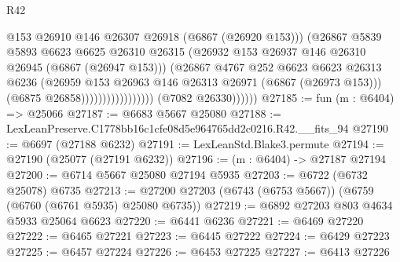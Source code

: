 \begin{lexlean}{R42}
\begin{coremodule}
{                                            @153
                                            @26910
                                            @146
                                            @26307
                                            @26918
                                            (@6867 (@26920 @153)))
                                          (@26867
                                            @5839
                                            @5893
                                            @6623
                                            @6625
                                            @26310
                                            @26315
                                            (@26932
                                              @153
                                              @26937
                                              @146
                                              @26310
                                              @26945
                                              (@6867 (@26947 @153)))
                                            (@26867
                                              @4767
                                              @252
                                              @6623
                                              @6623
                                              @26313
                                              @6236
                                              (@26959
                                                @153
                                                @26963
                                                @146
                                                @26313
                                                @26971
                                                (@6867 (@26973 @153)))
                                              (@6875 @26858)))))))))))))))))
              (@7082 @26330))))))
@27185 := fun (m : @6404) => @25066
@27187 := @6683 @5667 @25080
@27188 := LexLeanPreserve.C1778bb16c1cfe08d5e964765dd2c0216.R42.__fits_94
@27190 := @6697 (@27188 @6232)
@27191 := LexLeanStd.Blake3.permute
@27194 := @27190 (@25077 (@27191 @6232))
@27196 := (m : @6404) -> @27187 @27194
@27200 := @6714 @5667 @25080 @27194 @5935
@27203 := @6722 (@6732 @25078) @6735
@27213 := @27200 @27203 (@6743 (@6753 @5667)) (@6759 (@6760 (@6761 @5935) @25080 @6735))
@27219 := @6892 @27203 @803 @4634 @5933 @25064 @6623
@27220 := @6441 @6236
@27221 := @6469 @27220
@27222 := @6465 @27221
@27223 := @6445 @27222
@27224 := @6429 @27223
@27225 := @6457 @27224
@27226 := @6453 @27225
@27227 := @6413 @27226
}
\end{coremodule}
\end{lexlean}
